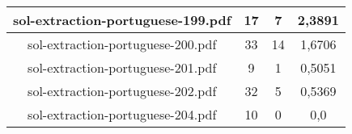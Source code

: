 \documentclass[11pt]{article}
\newlength\mylength
\begin{document}
\begin{center}
\begin{longtable}{||C{.40\mylength}||C{.30\mylength}||C{.30\mylength}||C{.30\mylength}||}
  sol-extraction-portuguese-199.pdf & 17 & 7 & 2,3891 \\  \hline
  sol-extraction-portuguese-200.pdf & 33 & 14 & 1,6706 \\  \hline
  sol-extraction-portuguese-201.pdf & 9 & 1 & 0,5051 \\  \hline
  sol-extraction-portuguese-202.pdf & 32 & 5 & 0,5369 \\  \hline
  sol-extraction-portuguese-204.pdf & 10 & 0 & 0,0 \\  \hline
  
\end{longtable}
\end{center}
\end{document}
